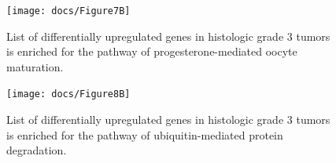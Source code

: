 \documentclass[a4paper,10pt]{article}
\begin{document}
 \begin{figure}
\centering
\texttt{[image: docs/Figure7B]}
\caption{ List of differentially upregulated genes in 
histologic grade 3 tumors is enriched for the pathway 
of progesterone-mediated oocyte maturation.}\label{7B}
\end{figure}

 \begin{figure}
\centering
\texttt{[image: docs/Figure8B]}
\caption{ List of differentially upregulated genes in histologic grade 
3 tumors is enriched for the pathway of ubiquitin-mediated protein 
degradation.}\label{8B}
\end{figure}
\end{document}
